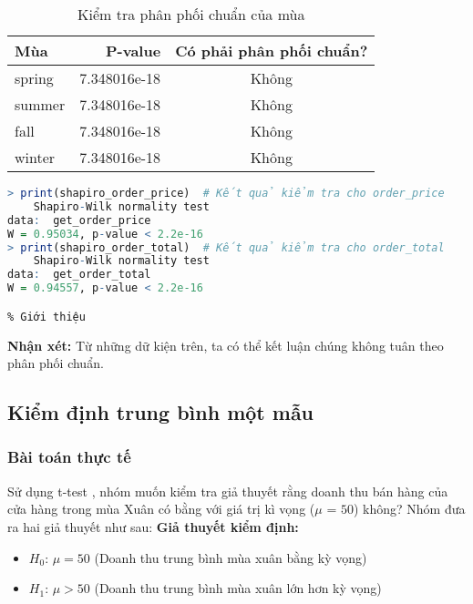 \begin{table}[H]
\centering
\begin{tabular}{|l|r|c|} %
\hline
\textbf{Mùa} & \textbf{P-value}       & \textbf{Có phải phân phối chuẩn?} \\ \hline
spring          & 7.348016e-18          & Không                        \\ \hline
summer          & 7.348016e-18          & Không                        \\ \hline
fall            & 7.348016e-18          & Không                        \\ \hline
winter          & 7.348016e-18          & Không                        \\ \hline
\end{tabular}
\caption{Kiểm tra phân phối chuẩn của mùa}
\label{tab:normality_results}
\end{table}
\begin{lstlisting}[language=R,caption=Hai cột còn lại]
> print(shapiro_order_price)  # Kết quả kiểm tra cho order_price
	Shapiro-Wilk normality test
data:  get_order_price
W = 0.95034, p-value < 2.2e-16
> print(shapiro_order_total)  # Kết quả kiểm tra cho order_total
	Shapiro-Wilk normality test
data:  get_order_total
W = 0.94557, p-value < 2.2e-16

% Giới thiệu

\end{lstlisting}
\begin{boxH}
    \textbf{Nhận xét:} Từ những dữ kiện trên, ta có thể kết luận chúng không tuân theo phân phối chuẩn.
\end{boxH}
\subsection{Kiểm định trung bình một mẫu}
\subsubsection{Bài toán thực tế}
Sử dụng t-test , nhóm muốn kiểm tra giả thuyết rằng doanh thu bán hàng của cửa hàng trong mùa Xuân có bằng với giá trị kì vọng ($\mu$ = $50$) không? 
Nhóm đưa ra hai giả thuyết như sau:
\textbf{Giả thuyết kiểm định:}
\begin{itemize}
    \item \( H_0 \): \( \mu = 50 \) (Doanh thu trung bình mùa xuân bằng kỳ vọng)
    \item \( H_1 \): \( \mu > 50 \) (Doanh thu trung bình mùa xuân lớn hơn kỳ vọng)
\end{itemize}

